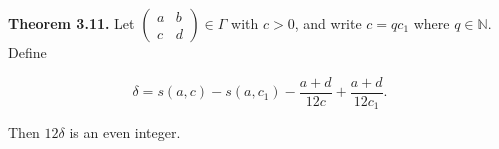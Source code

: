 \textbf{Theorem 3.11.}
Let $\begin{pmatrix} a & b \\ c & d \end{pmatrix} \in \Gamma$ with $c > 0$, and write $c = qc_1$ where $q \in \mathbb{N}$. Define

$$
\delta = s(a, c) - s(a, c_1) - \frac{a + d}{12c} + \frac{a + d}{12c_1}.
$$

Then $12\delta$ is an even integer.
